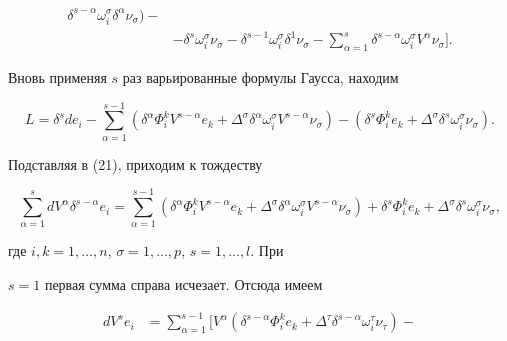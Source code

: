 \begin{pf}
\begin{align*}
\delta^{s-\alpha}\omega^{\sigma}_i\delta^{\alpha}\nu_{\sigma})-\\


&-\delta^s\omega^{\sigma}_i\nu_{\sigma}-


\delta^{s-1}\omega^{\sigma}_i\delta^1\nu_{\sigma}-


\sum_{\alpha=1}^{s}\delta^{s-\alpha}\omega^{\sigma}_iV^{\alpha}


\nu_{\sigma}\biggr].


\end{align*}


%


Вновь применяя $s$ раз варьированные формулы Гаусса, находим


$$


L = \delta^sde_i-\sum_{\alpha=1}^{s-1}(


\delta^{\alpha}\Phi^k_iV^{s-\alpha}e_k+\Delta^{\sigma}


\delta^{\alpha}\omega^{\sigma}_iV^{s-\alpha}\nu_{\sigma})-


(\delta^s\Phi^k_ie_k+\Delta^{\sigma}\delta^s


\omega^{\sigma}_i\nu_{\sigma}).


$$


Подставляя в (21), приходим к тождеству


\begin{equation}


\sum_{\alpha=1}^{s}dV^{\alpha}\delta^{s-\alpha}e_i= 


\sum_{\alpha=1}^{s-1}(\delta^{\alpha}\Phi^k_iV^{s-\alpha}e_k+


\Delta^{\sigma}\delta^{\alpha}\omega^{\sigma}_iV^{s-\alpha}


\nu_{\sigma})+


\delta^s\Phi^k_ie_k+\Delta^{\sigma}\delta^s\omega^{\sigma}_i


\nu_{\sigma},


\end{equation}


где $i,k= 1,\dotsc,n$, $\sigma= 1,\dotsc,p$, $s=1,\dotsc,l$. При


$s= 1$ первая сумма справа исчезает. Отсюда имеем


\begin{equation}


\begin{split}


dV^se_i &=\sum_{\alpha=1}^{s-1}[V^{\alpha}(\delta^{s-\alpha}\Phi^k_ie_k+


\Delta^{\tau}\delta^{s-\alpha}\omega^{\tau}_i\nu_{\tau})-



\end{split}
\end{equation}
\end{pf}
